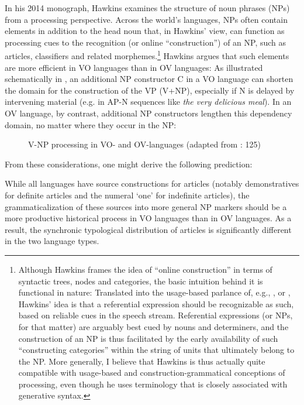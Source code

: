 \documentclass[output=paper]{langsci/langscibook}
\begin{document}
In his 2014 monograph, Hawkins examines the structure of noun phrases (NPs) from a processing perspective. Across the world’s languages, NPs often contain elements in addition to the head noun that, in Hawkins’ view, can function as processing cues to the recognition (or online “construction”) of an NP, such as articles, classifiers and related morphemes.\footnote{Although Hawkins frames the idea of “online construction” in terms of syntactic trees, nodes and categories, the basic intuition behind it is functional in nature: Translated into the usage-based parlance of, e.g., \citet{Croft2001}, \citet{BecknerBybee2009} or \citet{BatesMacWhinney1989}, Hawkins’ idea is that a referential expression should be recognizable as such, based on reliable cues in the speech stream. Referential expressions (or NPs, for that matter) are arguably best cued by nouns and determiners, and the construction of an NP is thus facilitated by the early availability of such “constructing categories” within the string of units that ultimately belong to the NP. More generally, I believe that Hawkins is thus actually quite compatible with usage-based and construction-grammatical conceptions of processing, even though he uses terminology that is closely associated with generative syntax.}  Hawkins argues that such elements are more efficient in VO languages than in OV languages: As illustrated schematically in , an additional NP constructor C in a VO language can shorten the domain for the construction of the VP (V+NP), especially if N is delayed by intervening material (e.g. in AP-N sequences like \textit{the very delicious meal}). In an OV language, by contrast, additional NP constructors lengthen this dependency domain, no matter where they occur in the NP:

  
 \begin{figure}
\caption{V-NP processing in VO- and OV-languages (adapted from \citealt{Hawkins2014}: 125)}
\label{fig:ksb:1} 
 \end{figure}


From these considerations, one might derive the following prediction:

\ea
{While all languages have source constructions for articles (notably demonstratives for definite articles and the numeral ‘one’ for indefinite articles), the grammaticalization of these sources into more general NP markers should be a more productive historical process in VO languages than in OV languages. As a result, the synchronic typological distribution of articles is significantly different in the two language types.}\\
\z
\end{document}
